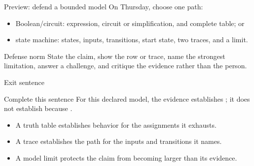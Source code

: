 \begin{frame}{Preview: defend a bounded model}
On Thursday, choose one path:
\begin{itemize}
\item Boolean/circuit: expression, circuit or simplification, and complete table; or
\item state machine: states, inputs, transitions, start state, two traces, and a limit.
\end{itemize}
\begin{block}{Defense norm}
State the claim, show the row or trace, name the strongest limitation, answer a challenge, and critique the evidence rather than the person.
\end{block}
\end{frame}

\begin{frame}{Exit sentence}
\begin{block}{Complete this sentence}
For this declared model, the evidence establishes \underline{\hspace{4cm}}; it does not establish \underline{\hspace{4cm}} because \underline{\hspace{3cm}}.
\end{block}
\begin{itemize}
\item A truth table establishes behavior for the assignments it exhausts.
\item A trace establishes the path for the inputs and transitions it names.
\item A model limit protects the claim from becoming larger than its evidence.
\end{itemize}
\end{frame}
